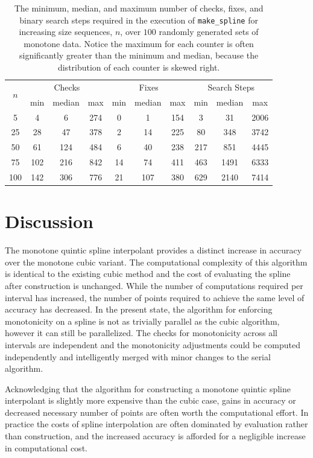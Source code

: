\documentclass{scspaperproc}
\theoremstyle{scsthe}
\begin{document}
\begin{table}
  \centering
  \begin{tabular}{c|c c c|c c c|c c c}
    \hline
    \multirow{2}{*}{$n$}
      & \multicolumn{3}{c|}{Checks} & \multicolumn{3}{c}{Fixes} & \multicolumn{3}{|c}{Search Steps} \\
      & min & median & max & min & median & max & min & median & max \\
    \hline
    5 & 4 & 6 & 274 & 0 & 1 & 154 & 3 & 31 & 2006\\
    25 & 28 & 47 & 378 & 2 & 14 & 225 & 80 & 348 & 3742\\
    50 & 61 & 124 & 484 & 6 & 40 & 238 & 217 & 851 & 4445\\
    75 & 102 & 216 & 842 & 14 & 74 & 411 & 463 & 1491 & 6333\\
    100 & 142 & 306 & 776 & 21 & 107 & 380 & 629 & 2140 & 7414\\
    \hline
  \end{tabular}
  \caption{The minimum, median, and maximum number of checks, fixes, and binary search steps required in the execution of \texttt{make\_spline} for increasing size sequences, $n$, over $100$ randomly generated sets of monotone data. Notice the maximum for each counter is often significantly greater than the minimum and median, because the distribution of each counter is skewed right.}
  \label{table:e3_results}
\end{table}

\section{Discussion}
\label{sec:discussion}

The monotone quintic spline interpolant provides a distinct increase in accuracy over the monotone cubic variant. The computational complexity of this algorithm is identical to the existing cubic method and the cost of evaluating the spline after construction is unchanged. While the number of computations required per interval has increased, the number of points required to achieve the same level of accuracy has decreased. In the present state, the algorithm for enforcing monotonicity on a spline is not as trivially parallel as the cubic algorithm, however it can still be parallelized. The checks for monotonicity across all intervals are independent and the monotonicity adjustments could be computed independently and intelligently merged with minor changes to the serial algorithm.

Acknowledging that the algorithm for constructing a monotone quintic spline interpolant is slightly more expensive than the cubic case, gains in accuracy or decreased necessary number of points are often worth the computational effort. In practice the costs of spline interpolation are often dominated by evaluation rather than construction, and the increased accuracy is afforded for a negligible increase in computational cost.
\end{document}
